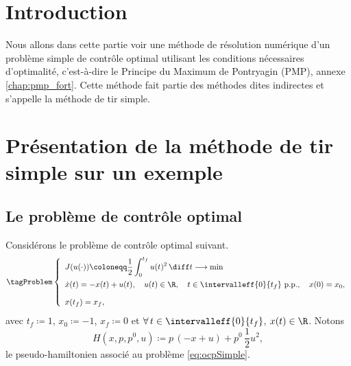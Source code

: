 \section{Introduction}

Nous allons dans cette partie voir une m\'ethode de r\'esolution num\'erique d'un probl\`eme simple de
contr\^ole optimal utilisant les conditions n\'ecessaires d'optimalit\'e, c'est-\`a-dire le Principe
du Maximum de Pontryagin (PMP), \cf annexe \ref{chap:pmp_fort}. Cette m\'ethode fait partie des m\'ethodes dites indirectes et s'appelle
la m\'ethode de tir simple.

\section{Pr\'esentation de la m\'ethode de tir simple sur un exemple}

\subsection{Le probl\`eme de contr\^ole optimal}

    Consid\'erons le probl\`eme de contr\^ole optimal suivant.
    \leqnomode
    \begin{equation}
    \tagProblem
        \left\{ 
            \begin{array}{l}
                \displaystyle J(u(\cdot))  \coloneqq \displaystyle \frac{1}{2} \int_0^{t_f} u(t)^2 \, \diff t\longrightarrow \min \\[1.0em]
                \dot{x}(t)  =  \displaystyle -x(t)+u(t), \quad  u(t) \in \R, \quad t \in \intervalleff{0}{t_f} \text{ p.p.},\quad x(0) = x_0, \\[1.0em]
                x(t_f) = x_f,
            \end{array}
        \right. 
        \label{eq:ocpSimple}
    \end{equation}
    \reqnomode
    avec $t_f \coloneqq 1$, $x_0 \coloneqq -1$, $x_f \coloneqq 0$ et $\forall\, t \in\intervalleff{0}{t_f}$, $x(t) \in \R$.
    Notons 
    \[
        H(x,p,p^0,u) \coloneqq p \, (-x+u) + p^0\, \frac{1}{2} u^2,
    \]
    le pseudo-hamiltonien associ\'e au probl\`eme \eqref{eq:ocpSimple}.

